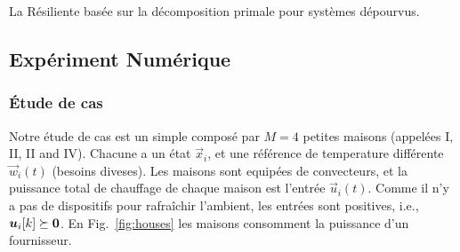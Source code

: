 \documentclass[../main.tex]{subfiles}
\begin{document}
\begin{algorithm2e}[h]
  \DontPrintSemicolon
  \caption{La \dmpc{} Résiliente basée sur la décomposition primale pour systèmes dépourvus.}\label{alg:rpdbdmpcss_fr}
\end{algorithm2e}

\subsection{Expériment Numérique}\label{sec:numerical-experiment_fr}

\subsubsection{Étude de cas}\label{sec:case-study_fr}

Notre étude de cas est un simple \dhn{} composé par ${M=4}$ petites maisons (appelées I, II, II and IV).
Chacune a un état $\vec{x}_{i}$, et une référence de temperature différente $\vec{w}_{i}(t)$ (besoins diveses).
Les maisons sont equipées de convecteurs, et la puissance total de chauffage de chaque maison est l'entrée $\vec{u}_{i}(t)$.
Comme il n'y a pas de dispositifs pour rafraîchir l'ambient, les entrées sont positives, i.e., $\boldsymbol{u}_{i}[k]\succeq\mathbf{0}$.
En Fig.~\ref{fig:houses} les maisons consomment la puissance d'un fournisseur.
\end{document}
